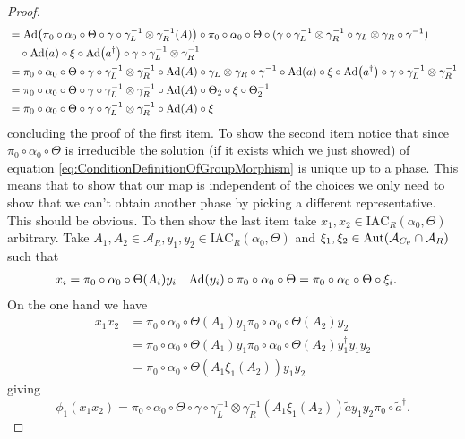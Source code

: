 \documentclass[12pt,a4paper,twoside]{article}
\let\originalleft\left
\let\originalright\right
\renewcommand{\left}{\mathopen{}\mathclose\bgroup\originalleft}
\renewcommand{\right}{\aftergroup\egroup\originalright}
\renewcommand{\AA}{\mathcal A}
\newcommand{\Ad}[1]{\textrm{Ad}\left(#1\right)}
\newcommand{\Aut}[1]{\textrm{Aut}\left(#1\right)}
\theoremstyle{definition}
\numberwithin{equation}{section}
\begin{document}
\begin{proof}
	\begin{align}
		&=\Ad{\pi_0\circ\alpha_0\circ\Theta\circ\gamma\circ\gamma_L^{-1}\otimes\gamma_R^{-1}(A)}\circ\pi_0\circ\alpha_0\circ\Theta\circ(\gamma\circ\gamma_L^{-1}\otimes\gamma_R^{-1}\circ\gamma_L\otimes\gamma_R\circ\gamma^{-1})\\
		\nonumber
		&\quad\circ\Ad{a}\circ\xi\circ\Ad{a^\dagger}\circ\gamma\circ\gamma_L^{-1}\otimes\gamma_R^{-1}\\
		&=\pi_0\circ\alpha_0\circ\Theta\circ\gamma\circ\gamma_L^{-1}\otimes\gamma_R^{-1}\circ\Ad{A}\circ\gamma_L\otimes\gamma_R\circ\gamma^{-1}\circ\Ad{a}\circ\xi\circ\Ad{a^\dagger}\circ\gamma\circ\gamma_L^{-1}\otimes\gamma_R^{-1}\\
		&=\pi_0\circ\alpha_0\circ\Theta\circ\gamma\circ\gamma_L^{-1}\otimes\gamma_R^{-1}\circ\Ad{A}\circ\Theta_2\circ\xi\circ\Theta_2^{-1}\\
		&=\pi_0\circ\alpha_0\circ\Theta\circ\gamma\circ\gamma_L^{-1}\otimes\gamma_R^{-1}\circ\Ad{A}\circ\xi
	\end{align}
	concluding the proof of the first item. To show the second item notice that since $\pi_0\circ\alpha_0\circ\Theta$ is irreducible the solution (if it exists which we just showed) of equation \eqref{eq:ConditionDefinitionOfGroupMorphism} is unique up to a phase. This means that to show that our map is independent of the choices we only need to show that we can't obtain another phase by picking a different representative. This should be obvious. To then show the last item take $x_1,x_2\in \textrm{IAC}_R(\alpha_0,\Theta)$ arbitrary. Take $A_1,A_2\in\AA_R,y_1,y_2\in \textrm{IAC}_R(\alpha_0,\Theta)$ and $\xi_1,\xi_2\in\Aut{\AA_{C_\theta}\cap\AA_R}$ such that
	\begin{align}
		x_i&=\pi_0\circ\alpha_0\circ\Theta(A_i)y_i&\Ad{y_i}\circ\pi_0\circ\alpha_0\circ\Theta&=\pi_0\circ\alpha_0\circ\Theta\circ\xi_i.
	\end{align}
	On the one hand we have
	\begin{align}
		x_1x_2&=\pi_0\circ\alpha_0\circ\Theta(A_1)y_1\pi_0\circ\alpha_0\circ\Theta(A_2)y_2\\
		&=\pi_0\circ\alpha_0\circ\Theta(A_1)y_1\pi_0\circ\alpha_0\circ\Theta(A_2)y_1^{\dagger}y_1y_2\\
		&=\pi_0\circ\alpha_0\circ\Theta(A_1\xi_1(A_2))y_1y_2
	\end{align}
	giving
	\begin{equation}
		\phi_1(x_1x_2)=\pi_0\circ\alpha_0\circ\Theta\circ\gamma\circ\gamma_L^{-1}\otimes\gamma_R^{-1}(A_1\xi_1(A_2))\tilde{a}y_1y_2\pi_0\circ\tilde{a}^\dagger.

\end{equation}
\end{proof}
\end{document}
